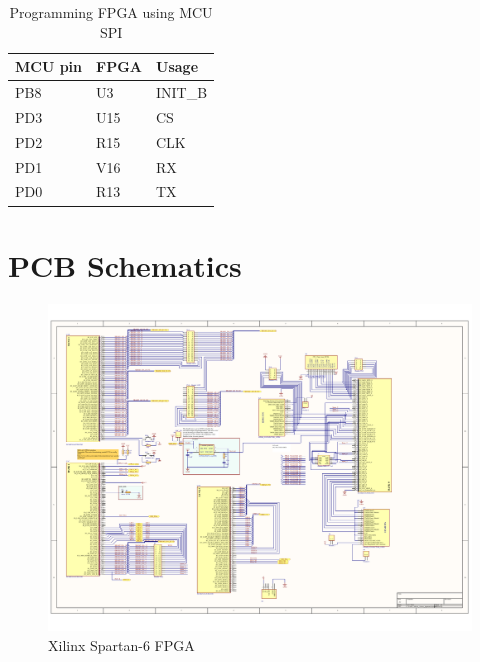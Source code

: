 \begin{table}[]
    \centering
    \begin{tabular}{lll}
        MCU pin & FPGA & Usage   \\
        \hline
        PB8     & U3   & INIT\_B \\
        PD3     & U15  & CS      \\
        PD2     & R15  & CLK     \\
        PD1     & V16  & RX      \\
        PD0     & R13  & TX
    \end{tabular}
    \caption{Programming FPGA using MCU SPI}
    \label{tab:SpiProgrammer}
\end{table}

\chapter{PCB Schematics}
\begin{figure}
    \includegraphics[width=\paperwidth, angle=90]{img/FPGA_Xilinx_Spartan6.pdf}
    \caption{Xilinx Spartan-6 FPGA}
    \label{fig:FPGA_Xilinx_Spartan6}
\end{figure}

